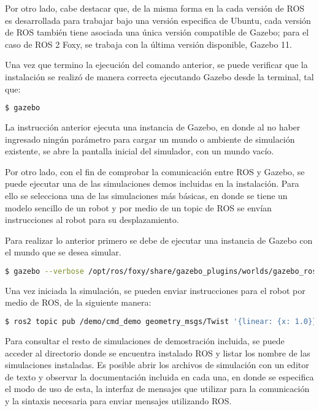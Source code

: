 Por otro lado, cabe destacar que, de la misma forma en la cada versión de ROS es desarrollada para trabajar bajo una versión especifica de Ubuntu, cada versión de ROS también tiene asociada una única versión compatible de Gazebo; para el caso de ROS 2 Foxy, se trabaja con la última versión disponible, Gazebo 11.

Una vez que termino la ejecución del comando anterior, se puede verificar que la instalación se realizó de manera correcta ejecutando Gazebo desde la terminal, tal que:

\begin{lstlisting}[language = bash]
    $ gazebo
\end{lstlisting}

La instrucción anterior ejecuta una instancia de Gazebo, en donde al no haber ingresado ningún parámetro para cargar un mundo o ambiente de simulación existente, se abre la pantalla inicial del simulador, con un mundo vacío.

Por otro lado, con el fin de comprobar la comunicación entre ROS y Gazebo, se puede ejecutar una de las simulaciones demos incluidas en la instalación. Para ello se selecciona una de las simulaciones más básicas, en donde se tiene un modelo sencillo de un robot y por medio de un topic de ROS se envían instrucciones al robot para su desplazamiento.

Para realizar lo anterior primero se debe de ejecutar una instancia de Gazebo con el mundo que se desea simular.

\begin{lstlisting}[language = bash]
    $ gazebo --verbose /opt/ros/foxy/share/gazebo_plugins/worlds/gazebo_ros_diff_drive_demo.world
\end{lstlisting}

Una vez iniciada la simulación, se pueden enviar instrucciones para el robot por medio de ROS, de la siguiente manera:

\begin{lstlisting}[language = bash]
    $ ros2 topic pub /demo/cmd_demo geometry_msgs/Twist '{linear: {x: 1.0}}' -1
\end{lstlisting}

Para consultar el resto de simulaciones de demostración incluida, se puede acceder al directorio donde se encuentra instalado ROS y listar los nombre de las simulaciones instaladas. Es posible abrir los archivos de simulación con un editor de texto y observar la documentación incluida en cada una, en donde se especifica el modo de uso de esta, la interfaz de mensajes que utilizar para la comunicación y la sintaxis necesaria para enviar mensajes utilizando ROS.


